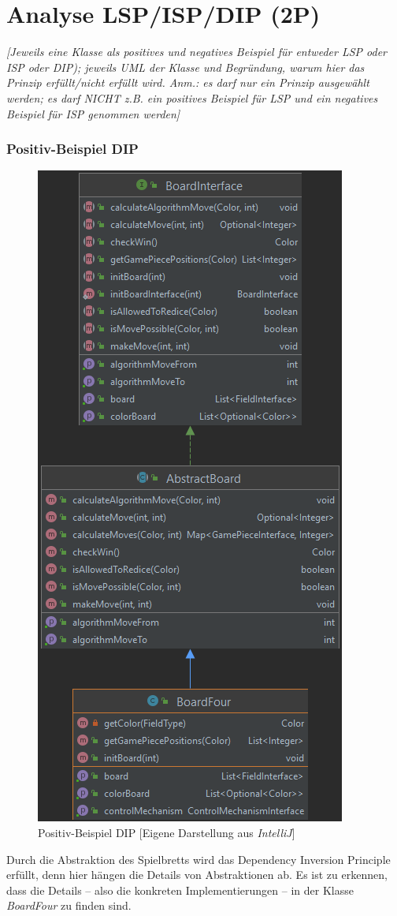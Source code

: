 \newpage
\section{Analyse LSP/ISP/DIP (2P)}
\emph{[Jeweils eine Klasse als positives und negatives Beispiel für entweder LSP oder ISP oder DIP); jeweils
UML der Klasse und Begründung, warum hier das Prinzip erfüllt/nicht erfüllt wird. Anm.: es darf nur ein Prinzip ausgewählt werden; es darf NICHT z.B. ein positives Beispiel für LSP und ein negatives Beispiel für ISP genommen werden]}

\subsubsection{Positiv-Beispiel DIP}
\begin{figure}[htbp]
\centering
\centerline{\includegraphics[scale=.45]{positivbeispiel_dip}}
\caption{Positiv-Beispiel DIP [Eigene Darstellung aus \emph{IntelliJ}]}
\label{fig:positivbeispiel_dip}
\end{figure}
\noindent Durch die Abstraktion des Spielbretts wird das Dependency Inversion Principle erfüllt, denn hier hängen die Details von Abstraktionen ab. Es ist zu erkennen, dass die Details -- also die konkreten Implementierungen -- in der Klasse \emph{BoardFour} zu finden sind.


